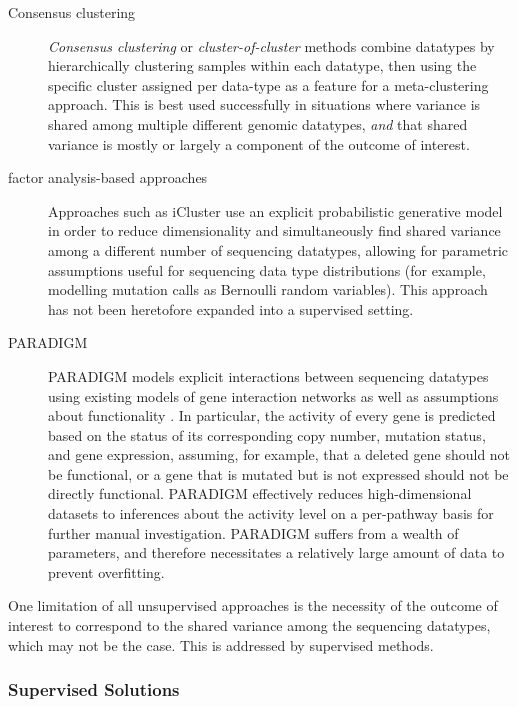 \begin{description}
\item[Consensus clustering]
  \textit{Consensus clustering} or \textit{cluster-of-cluster} methods combine datatypes by hierarchically clustering samples within each datatype, then using the specific cluster assigned per data-type as a feature for a meta-clustering approach. This is best used successfully in situations where variance is shared among multiple different genomic datatypes, \textit{and} that shared variance is mostly or largely a component of the outcome of interest.

\item[factor analysis-based approaches] Approaches such as iCluster \cite{shen_integrative_2012}\cite{shen_integrative_2009} use an explicit probabilistic generative model in order to reduce dimensionality and simultaneously find shared variance among a different number of sequencing datatypes, allowing for parametric assumptions useful for sequencing data type distributions (for example, modelling mutation calls as Bernoulli random variables). This approach has not been heretofore expanded into a supervised setting.

  
\item[PARADIGM]
  PARADIGM models explicit interactions between sequencing datatypes using existing models of gene interaction networks as well as assumptions about functionality \cite{vaske_inference_2010} \cite{ng_paradigm-shift_2012}. In particular, the activity of every gene is predicted based on the status of its corresponding copy number, mutation status, and gene expression, assuming, for example, that a deleted gene should not be functional, or a gene that is mutated but is not expressed should not be directly functional.
  PARADIGM effectively reduces high-dimensional datasets to inferences about the activity level on a per-pathway basis for further manual investigation. 
  PARADIGM suffers from a wealth of parameters, and therefore necessitates a relatively large amount of data to prevent overfitting.   
\end{description}

One limitation of all unsupervised approaches is the necessity of the outcome of interest to correspond to the shared variance among the sequencing datatypes, which may not be the case. This is addressed by supervised methods. 



\subsubsection{Supervised Solutions}

